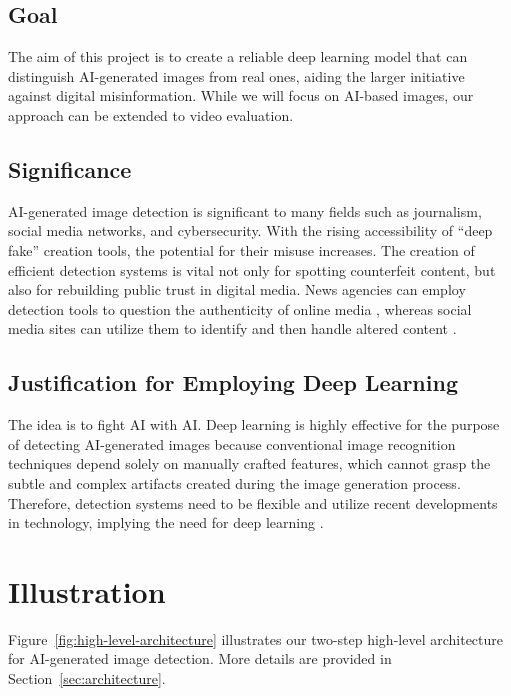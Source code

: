 \documentclass{article} %
\begin{document}
\subsection{Goal}
The aim of this project is to create a reliable deep learning model that can distinguish AI-generated images from real ones, aiding the larger initiative against digital misinformation. While we will focus on AI-based images, our approach can be extended to video evaluation.

\subsection{Significance}
AI-generated image detection is significant to many fields such as journalism, social media networks, and cybersecurity. With the rising accessibility of ``deep fake'' creation tools, the potential for their misuse increases. The creation of efficient detection systems is vital not only for spotting counterfeit content, but also for rebuilding public trust in digital media. News agencies can employ detection tools to question the authenticity of online media \citep{Kumarage2023}, whereas social media sites can utilize them to identify and then handle altered content \citep{clickinsights2023}.

\subsection{Justification for Employing Deep Learning}
The idea is to fight AI with AI. Deep learning is highly effective for the purpose of detecting AI-generated images because conventional image recognition techniques depend solely on manually crafted features, which cannot grasp the subtle and complex artifacts created during the image generation process. Therefore, detection systems need to be flexible and utilize recent developments in technology, implying the need for deep learning \citep{ledig2017}.

\section{Illustration}
\label{illustration}
Figure~\ref{fig:high-level-architecture} illustrates our two-step high-level architecture for AI-generated image detection. More details are provided in Section~\ref{sec:architecture}.
\end{document}
